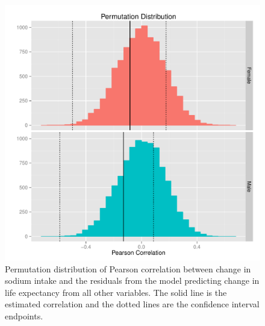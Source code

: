 \documentclass{article}
\begin{document}
\begin{figure}
\centering
\includegraphics[width = \textwidth]{permdistribution.pdf}
\caption{Permutation distribution of Pearson correlation between change in sodium intake and the residuals from the model predicting change in life expectancy from all other variables. The solid line is the estimated correlation and the dotted lines are the confidence interval endpoints.}
\end{figure}
\end{document}
